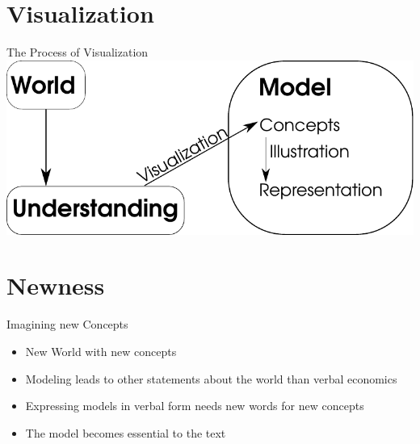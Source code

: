 \documentclass[ucs]{beamer}\usepackage[]{graphicx}\usepackage[]{color}
\begin{document}
\section{Visualization}
\begin{frame}{The Process of Visualization}
\includegraphics[scale = 0.8]{ImagingImaginingDiagramm.pdf}	
\end{frame}

\section{Newness}
\begin{frame}{Imagining new Concepts}
\begin{itemize}
\item New World with new concepts
\item Modeling leads to other statements about the world than verbal economics
\item Expressing models in verbal form needs new words for new concepts
\item The model becomes essential to the text
\end{itemize}
\end{frame}
\end{document}
